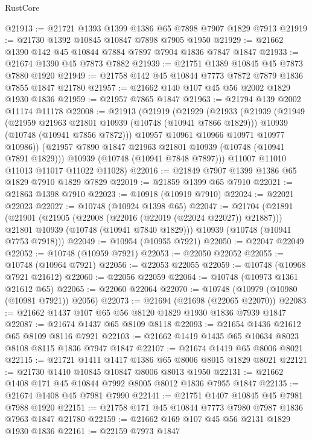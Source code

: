 \begin{lexlean}{RustCore}
\begin{coremodule}
@21913 := @21721 @1393 @1399 @1386 @65 @7898 @7907 @1829 @7913
@21919 := @21730 @1392 @10845 @10847 @7898 @7905 @1950
@21929 := @21662 @1390 @142 @45 @10844 @7884 @7897 @7904 @1836 @7847 @1847
@21933 := @21674 @1390 @45 @7873 @7882
@21939 := @21751 @1389 @10845 @45 @7873 @7880 @1920
@21949 := @21758 @142 @45 @10844 @7773 @7872 @7879 @1836 @7855 @1847 @21780
@21957 := @21662 @140 @107 @45 @56 @2002 @1829 @1930 @1836
@21959 := @21957 @7865 @1847
@21963 := @21794 @139 @2002 @11174 @11178
@22008 := @21913
    (@21919
      (@21929
        (@21933
          (@21939
            (@21949
              (@21959 @21963 @21801 @10939 (@10748 (@10941 @7866 @1829)))
              @10939
              (@10748 (@10941 @7856 @7872)))
            @10957
            @10961
            @10966
            @10971
            @10977
            @10986))
        (@21957 @7890 @1847 @21963 @21801 @10939 (@10748 (@10941 @7891 @1829)))
        @10939
        (@10748 (@10941 @7848 @7897)))
      @11007
      @11010
      @11013
      @11017
      @11022
      @11028)
@22016 := @21849 @7907 @1399 @1386 @65 @1829 @7910 @1829 @7829
@22019 := @21859 @1399 @65 @7910
@22021 := @21863 @1398 @7910
@22023 := @10918 (@10919 @7910)
@22024 := @22021 @22023
@22027 := @10748 (@10924 @1398 @65)
@22047 := @21704
    (@21891
      (@21901
        (@21905 (@22008 (@22016 (@22019 (@22024 @22027)) @21887)))
        @21801
        @10939
        (@10748 (@10941 @7840 @1829)))
      @10939
      (@10748 (@10941 @7753 @7918)))
@22049 := @10954 (@10955 @7921)
@22050 := @22047 @22049
@22052 := @10748 (@10959 @7921)
@22053 := @22050 @22052
@22055 := @10748 (@10964 @7921)
@22056 := @22053 @22055
@22059 := @10748 (@10968 @7921 @21612)
@22060 := @22056 @22059
@22064 := @10748 (@10973 @1361 @21612 @65)
@22065 := @22060 @22064
@22070 := @10748 (@10979 (@10980 (@10981 @7921)) @2056)
@22073 := @21694 (@21698 (@22065 @22070))
@22083 := @21662 @1437 @107 @65 @56 @8120 @1829 @1930 @1836 @7939 @1847
@22087 := @21674 @1437 @65 @8109 @8118
@22093 := @21654 @1436 @21612 @65 @8109 @8116 @7921
@22103 := @21662 @1419 @1435 @65 @10634 @8023 @8108 @8115 @1836 @7947 @1847
@22107 := @21674 @1419 @65 @8006 @8021
@22115 := @21721 @1411 @1417 @1386 @65 @8006 @8015 @1829 @8021
@22121 := @21730 @1410 @10845 @10847 @8006 @8013 @1950
@22131 := @21662 @1408 @171 @45 @10844 @7992 @8005 @8012 @1836 @7955 @1847
@22135 := @21674 @1408 @45 @7981 @7990
@22141 := @21751 @1407 @10845 @45 @7981 @7988 @1920
@22151 := @21758 @171 @45 @10844 @7773 @7980 @7987 @1836 @7963 @1847 @21780
@22159 := @21662 @169 @107 @45 @56 @2131 @1829 @1930 @1836
@22161 := @22159 @7973 @1847

\end{coremodule}
\end{lexlean}
